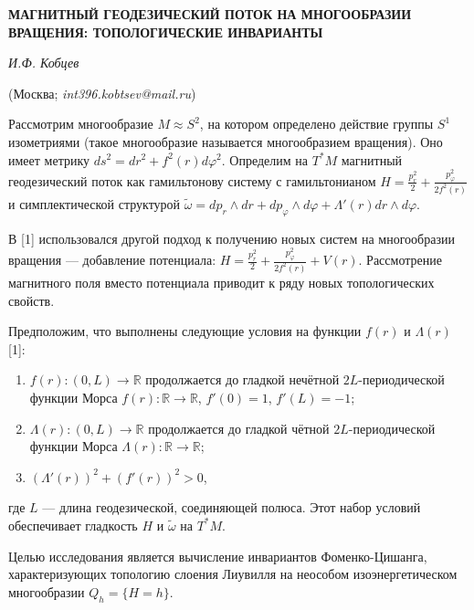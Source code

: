 %
%
%
%

\begin{center}
    {\bf МАГНИТНЫЙ ГЕОДЕЗИЧЕСКИЙ ПОТОК НА МНОГООБРАЗИИ ВРАЩЕНИЯ: ТОПОЛОГИЧЕСКИЕ ИНВАРИАНТЫ}

    {\it И.Ф. Кобцев}

    (Москва; {\it int396.kobtsev@mail.ru})
\end{center}

Рассмотрим многообразие $M \approx S^2$, на котором определено действие группы $S^1$ изометриями (такое многообразие называется многообразием вращения). Оно имеет метрику $ds^2=dr^2+f^2(r)d\varphi^2$. Определим на $T^*M$ магнитный геодезический поток как гамильтонову систему с гамильтонианом $H = \frac{p_r^2}{2}+\frac{p_\varphi^2}{2f^2(r)}$ и симплектической структурой $\widetilde{\omega}=dp_r \wedge dr + dp_\varphi \wedge d\varphi+\Lambda'(r)dr \wedge d\varphi$.

В [1] использовался другой подход к получению новых систем на многообразии вращения --- добавление потенциала: $H = \frac{p_r^2}{2}+\frac{p_\varphi^2}{2f^2(r)}+V(r)$. Рассмотрение магнитного поля вместо потенциала приводит к ряду новых топологических свойств.

Предположим, что выполнены следующие условия на функции $f(r)$ и $\Lambda(r)$ [1]:
\begin{enumerate}
	\item $f(r):(0,L)\to \mathbb{R}$ продолжается до гладкой нечётной $2L$-периодической функции Морса $f(r):\mathbb{R}\to \mathbb{R}$, $f'(0)=1$, $f'(L)=-1$;
	\item $\Lambda(r):(0,L)\to \mathbb{R}$ продолжается до гладкой чётной $2L$-периодической функции Морса $\Lambda(r):\mathbb{R}\to \mathbb{R}$;
	\item $(\Lambda'(r))^2+(f'(r))^2>0$,
\end{enumerate}
где $L$ --- длина геодезической, соединяющей полюса. Этот набор условий обеспечивает гладкость $H$ и $\widetilde{\omega}$ на $T^*M$.

Целью исследования является вычисление инвариантов Фоменко-Цишанга, характеризующих топологию слоения Лиувилля на неособом изоэнергетическом многообразии $Q_h=\{H=h\}$.

